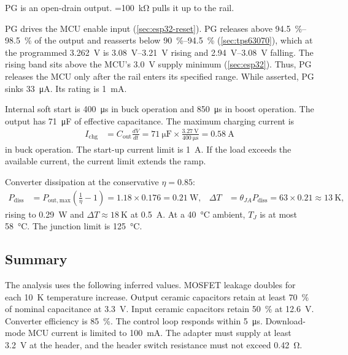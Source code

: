 PG is an open-drain output. =\SI{100}{\kilo\ohm} pulls it up to
the rail.

PG drives the MCU enable input (\cref{sec:esp32-reset}). PG releases above
\SIrange{94.5}{98.5}{\percent} of the output and reasserts below
\SIrange{90}{94.5}{\percent} (\cref{sec:tps63070}), which at the programmed
\SI{3.262}{\volt} is \SIrange{3.08}{3.21}{\volt} rising and
\SIrange{2.94}{3.08}{\volt} falling. The rising band sits above the MCU's
\SI{3.0}{\volt} supply minimum (\cref{sec:esp32}). Thus, PG releases the MCU
only after the rail enters its specified range. While asserted, PG sinks
\SI{33}{\micro\ampere}. Its rating is \SI{1}{\milli\ampere}.

Internal soft start is \SI{400}{\micro\second} in buck operation and
\SI{850}{\micro\second} in boost operation. The output has
\SI{71}{\micro\farad} of effective capacitance. The maximum charging current is
\begin{align*}
  I_{\mathrm{chg}} &= C_{\mathrm{out}}\frac{dV}{dt}
    = \SI{71}{\micro\farad}\times\frac{\SI{3.27}{\volt}}{\SI{400}{\micro\second}}
    = \SI{0.58}{\ampere}
\end{align*}
in buck operation. The start-up current limit is \SI{1}{\ampere}. If the load
exceeds the available current, the current limit extends the ramp.

Converter dissipation at the conservative $\eta=0.85$:
\begin{align*}
  P_{\mathrm{diss}} &= P_{\mathrm{out,max}}\left(\frac{1}{\eta}-1\right)
    = 1.18 \times 0.176 = \SI{0.21}{\watt}, &
  \Delta T &= \theta_{JA}P_{\mathrm{diss}} = 63 \times 0.21 \approx \SI{13}{\kelvin},
\end{align*}
rising to \SI{0.29}{\watt} and $\Delta T\approx\SI{18}{\kelvin}$ at
\SI{0.5}{\ampere}. At a \SI{40}{\celsius} ambient, $T_J$ is at most
\SI{58}{\celsius}. The junction limit is \SI{125}{\celsius}.

\subsection{Summary}\label{sec:3v3-summary}

The analysis uses the following inferred values. MOSFET leakage doubles for
each \SI{10}{\kelvin} temperature increase. Output ceramic capacitors retain
at least \SI{70}{\percent} of nominal capacitance at \SI{3.3}{\volt}. Input
ceramic capacitors retain \SI{50}{\percent} at \SI{12.6}{\volt}. Converter
efficiency is \SI{85}{\percent}. The control loop responds within
\SI{5}{\micro\second}. Download-mode MCU current is limited to
\SI{100}{\milli\ampere}. The adapter must supply at least \SI{3.2}{\volt} at
the header, and the header switch resistance must not exceed \SI{0.42}{\ohm}.

